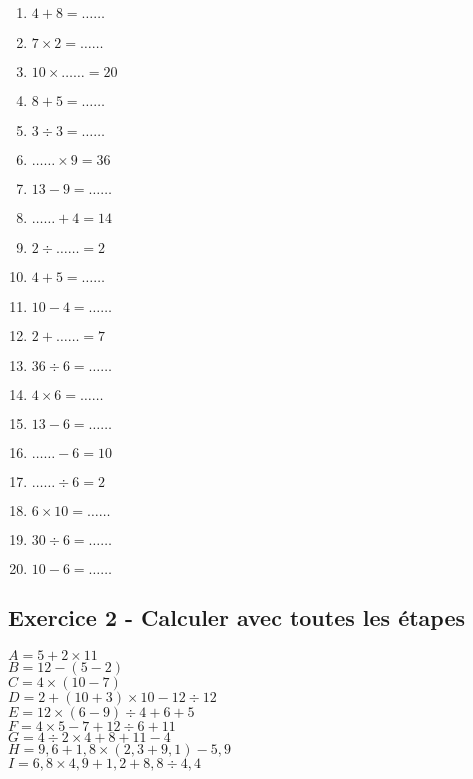 \documentclass[11pt]{article}
\begin{document}
\begin{multicols}{4}\noindent
  \begin{enumerate}
  \item $4 + 8 = \ldots\ldots$
  \item $7 \times 2 = \ldots\ldots$
  \item $10 \times \ldots\ldots = 20$
  \item $8 + 5 = \ldots\ldots$
  \item $3 \div 3 = \ldots\ldots$
  \item $\ldots\ldots \times 9 = 36$
  \item $13 - 9 = \ldots\ldots$
  \item $\ldots\ldots + 4 = 14$
  \item $2 \div \ldots\ldots = 2$
  \item $4 + 5 = \ldots\ldots$
  \item $10 - 4 = \ldots\ldots$
  \item $2 + \ldots\ldots = 7$
  \item $36 \div 6 = \ldots\ldots$
  \item $4 \times 6 = \ldots\ldots$
  \item $13 - 6 = \ldots\ldots$
  \item $\ldots\ldots - 6 = 10$
  \item $\ldots\ldots \div 6 = 2$
  \item $6 \times 10 = \ldots\ldots$
  \item $30 \div 6 = \ldots\ldots$ 
  \item $10 - 6 = \ldots\ldots$
  \end{enumerate}
  \end{multicols}

\subsection*{Exercice 2 - Calculer avec toutes les étapes}

\begin{multicols}{3}
  \noindent
  $A = 5+2\times 11 $\\
  $B = 12-(5-2) $\\
  $C = 4 \times (10-7) $\\
  $D = 2+(10+3)\times 10-12\div 12 $\\
  $E = 12 \times (6-9) \div 4+6+5 $\\
  $F = 4\times 5-7+12\div 6+11 $\\
  $G = 4\div 2\times 4+8+11-4 $\\
  $H = 9{,}6+1{,}8\times (2{,}3+9{,}1)-5{,}9 $\\
  $I= 6{,}8\times 4{,}9+1{,}2+8{,}8\div 4{,}4$
  \end{multicols}
\end{document}
